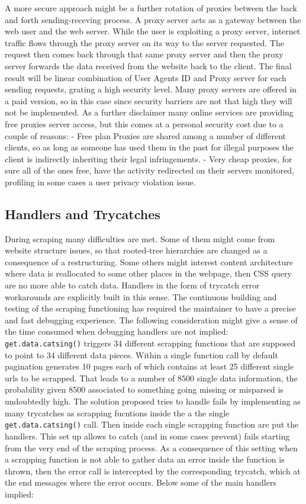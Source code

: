 \documentclass[
  12pt,
  a4paper,
  oneside]{book}
\theoremstyle{definition}
\theoremstyle{definition}
\theoremstyle{definition}
\theoremstyle{remark}
\begin{document}
A more secure approach might be a further rotation of proxies between the back and forth sending-receving process. A proxy server acts as a gateway between the web user and the web server.
While the user is exploiting a proxy server, internet traffic flows through the proxy server on its way to the server requested. The request then comes back through that same proxy server and then the proxy server forwards the data received from the website back to the client. The final result will be linear combination of User Agents ID and Proxy server for each sending requests, grating a high security level.
Many proxy servers are offered in a paid version, so in this case since security barriers are not that high they will not be implemented. As a further disclaimer many online services are providing free proxies server access, but this comes at a personal security cost due to a couple of reasons:
- Free plan Proxies are shared among a number of different clients, so as long as someone has used them in the past for illegal purposes the client is indirectly inheriting their legal infringements.
- Very cheap proxies, for sure all of the ones free, have the activity redirected on their servers monitored, profiling in some cases a user privacy violation issue.

\hypertarget{handlers-and-trycatches}{%
\subsection{Handlers and Trycatches}\label{handlers-and-trycatches}}

During scraping many difficulties are met. Some of them might come from website structure issues, so that rooted-tree hierarchies are changed as a consequence of a restructuring. Some others might interest content architecture where data is reallocated to some other places in the webpage, then CSS query are no more able to catch data. Handlers in the form of trycatch error workarounds are explicitly built in this sense. The continuous building and testing of the scraping functioning has required the maintainer to have a precise and fast debugging experience. The following consideration might give a sense of the time consumed when debugging handlers are not implied: \texttt{get.data.catsing()} triggers 34 different scrapping functions that are supposed to point to 34 different data pieces. Within a single function call by default pagination generates 10 pages each of which contains at least 25 different single urls to be scrapped. That leads to a number of 8500 single data information, the probability given 8500 associated to something going missing or misparsed is undoubtedly high.
The solution proposed tries to handle fails by implementing as many trycatches as scrapping fucntions inside the a the single \texttt{get.data.catsing()} call. Then inside each single scrapping function are put the handlers. This set up allows to catch (and in some cases prevent) fails starting from the very end of the scraping process. As a consequence of this setting when a scrapping function is not able to gather data an error inside the function is thrown, then the error call is intercepted by the corresponding trycatch, which at the end messages where the error occurs.
Below some of the main handlers implied:
\end{document}
